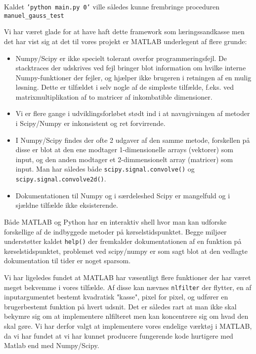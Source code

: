 Kaldet \texttt{'python main.py 0'} ville således kunne frembringe proceduren\\ \texttt{manuel\_gauss\_test}

Vi har været glade for at have haft dette framework som 
læringssandkasse men det har vist sig at det til vores projekt er MATLAB underlegent af flere grunde:
\begin{itemize}
	\item Numpy/Scipy er ikke specielt tolerant overfor programmeringsfejl. De stacktraces der udskrives ved fejl bringer blot information om hvilke interne Numpy-funktioner der fejler, og hjælper ikke brugeren i retningen af en mulig løsning. Dette er tilfældet i selv nogle af de simpleste tilfælde, f.eks. ved matrixmultiplikation af to matricer af inkombatible dimensioner. %
	\item Vi er flere gange i udviklingsforløbet stødt ind i at navngivningen af metoder i Scipy/Numpy er inkonsistent og ret forvirrende. 
	\item I Numpy/Scipy findes der ofte 2 udgaver af den samme metode, forskellen på disse er blot at den ene modtager 1-dimensionelle arrays (vektorer) som input, og den anden modtager et 2-dimmensionelt array (matricer) som input. Man har således både \texttt{scipy.signal.convolve()} og \texttt{scipy.signal.convolve2d()}.
	\item Dokumentationen til Numpy og i særdeleshed Scipy er mangelfuld og i sjældne tilfælde ikke eksisterende. 
\end{itemize}

Både MATLAB og Python har en interaktiv shell hvor man kan udforske forskellige af de indbyggede metoder på kørselstidspunktet. Begge miljøer understøtter kaldet \texttt{help()} der fremkalder dokumentationen af en funktion på kørselstidspunktet, problemet ved scipy/numpy er som sagt blot at den vedlagte dokumentation til tider er noget sparsom.

Vi har ligeledes fundet at MATLAB har væsentligt flere funktioner der har været meget bekvemme i vores tilfælde. Af disse kan nævnes \texttt{nlfilter} der flytter, en af inputargumentet bestemt kvadratisk "kasse", pixel for pixel, og udfører en brugerbestemt funktion på hvert udsnit. Det er således rart at man ikke skal bekymre sig om at implementere nlfilteret men kan koncentrere sig om hvad den skal gøre. 
Vi har derfor valgt at implementere vores endelige værktøj i MATLAB, da vi har fundet at vi har kunnet producere fungerende kode hurtigere med Matlab end med Numpy/Scipy. %
